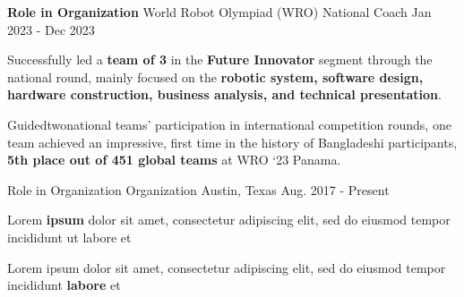 

\begin{cventries}

  \cventryalt
    {\textbf{Role in Organization}} %
    {World Robot Olympiad (WRO)} %
    {National Coach} %
    {Jan 2023 - Dec 2023} %
    {
      \begin{cvitems} %
        \item {Successfully led a \textbf{team of 3} in the \textbf{Future Innovator} segment through the national round, mainly focused on the \textbf{robotic system, software design, hardware construction, business analysis, and technical presentation}.}
        \item { Guidedtwonational teams' participation in international competition rounds, one team achieved an impressive, first time in the history of Bangladeshi participants, \textbf{5th place out of 451 global teams} at WRO ‘23 Panama.}
      \end{cvitems}
    }

  \cventry
    {Role in Organization} %
    {Organization} %
    {Austin, Texas} %
    {Aug. 2017 - Present} %
    {
      \begin{cvitems} %
        \item {Lorem \textbf{ipsum} dolor sit amet, consectetur adipiscing elit, sed do eiusmod tempor incididunt ut labore et}
        \item {Lorem ipsum dolor sit amet, consectetur adipiscing elit, sed do eiusmod tempor incididunt \textbf{labore} et}
      \end{cvitems}
    }

\end{cventries}

